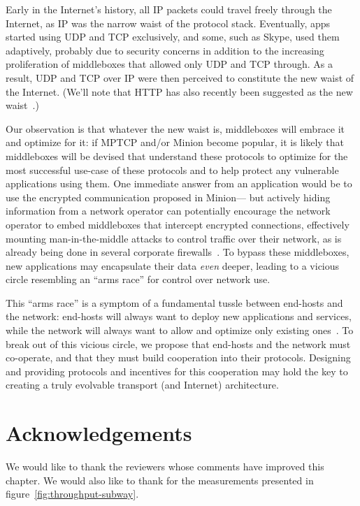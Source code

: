 Early in the Internet's history,
all IP packets could travel freely through the Internet, as IP was the narrow waist of
the protocol stack. 
Eventually, 
apps started using UDP and TCP exclusively,
and some, such as Skype, used them adaptively,
probably due to security concerns
in addition to the increasing proliferation of middleboxes that allowed only UDP and TCP through.
As a result, UDP and TCP over IP were then perceived to constitute the new waist of the Internet.
(We'll note that HTTP has also recently
been suggested as the new waist~\cite{popa10http}.) 

Our observation is that
whatever the new waist is,
middleboxes will embrace it and optimize for it: 
if MPTCP and/or Minion become popular, 
it is likely that middleboxes will be devised that understand these protocols
to optimize for the most successful use-case of these protocols
and to help protect any vulnerable applications using them.
One immediate answer from an application would be to
use the encrypted communication proposed in Minion---%
but actively hiding information from a network operator
can potentially encourage the network operator
to embed middleboxes that intercept encrypted connections,
effectively mounting man-in-the-middle attacks
to control traffic over their network,
as is already being done in several corporate firewalls~\cite{marko10using}.
To bypass these middleboxes,
new applications may encapsulate their data {\em even} deeper,
leading to a vicious circle resembling an ``arms race'' for control
over network use.

This ``arms race'' is a symptom of a fundamental tussle between
end-hosts and the network: end-hosts will always want to deploy new
applications and services, while the network will always want to allow and optimize only
existing ones~\cite{tussle}.
To break out of this vicious circle,
we propose that
end-hosts and the network must co-operate,
and that they must build cooperation into their protocols.
Designing and providing protocols and incentives for this cooperation may hold the key to creating a
truly evolvable transport (and Internet) architecture.


\section*{Acknowledgements}

We would like to thank the reviewers whose comments have improved this
chapter. We would also like to thank for the measurements presented in
figure~\ref{fig:throughput-subway}. 
